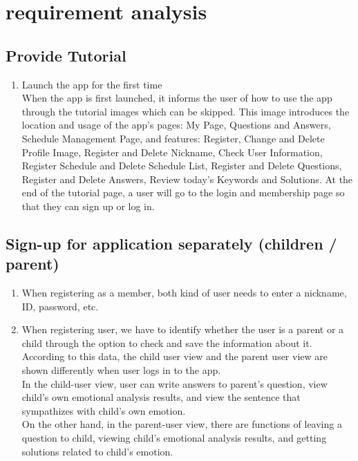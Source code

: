 \documentclass[conference]{IEEEtran}
\begin{document}
\newpage
\section{\large{requirement analysis}}
\subsection{Provide Tutorial}
\begin{enumerate}
  \item Launch the app for the first time \\
    When the app is first launched, it informs the user of how to use the app through the tutorial images which can be skipped. This image introduces the location and usage of the app's pages: My Page, Questions and Answers, Schedule Management Page, and features: Register, Change and Delete Profile Image, Register and Delete Nickname, Check User Information, Register Schedule and Delete Schedule List, Register and Delete Questions, Register and Delete Answers, Review today's Keywords and Solutions. At the end of the tutorial page, a user will go to the login and membership page so that they can sign up or log in.\\
  
\end{enumerate}

\subsection{Sign-up for application separately (children / parent)}

\begin{enumerate}
  \item When registering as a member, both kind of user needs to enter a nickname, ID, password, etc.\\
  
  \item When registering user, we have to identify whether the user is a parent or a child through the option to check and save the information about it. According to this data, the child user view and the parent user view are shown differently when user logs in to the app. 
  \\In the child-user view, user can write answers to parent’s question, view child’s own emotional analysis results, and view the sentence that sympathizes with child's own emotion. 
  \\On the other hand, in the parent-user view, there are functions of leaving a question to child, viewing child's emotional analysis results, and getting solutions related to child’s emotion.
\end{enumerate}
\vspace{0.5cm}
\end{document}
